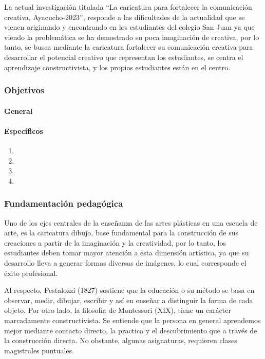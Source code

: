 \documentclass[12pt,a4paper]{article}
\begin{document}
La actual investigación titulada “La caricatura para fortalecer la comunicación creativa, Ayacucho-2023”, responde a las dificultades de la actualidad que se vienen originando y encontrando en los estudiantes del colegio San Juan ya que viendo la problemática se ha demostrado su  poca imaginación de creativa, por lo tanto, se busca mediante la caricatura fortalecer su comunicación creativa para desarrollar el potencial creativo que representan los estudiantes, se centra el aprendizaje constructivista, y los propios estudiantes están en el centro.

\subsubsection{Objetivos}

\paragraph{General}

\objetivo

\paragraph{Específicos}

\begin{enumerate}
\item \objetivoe
\item \objetivoee
\item \objetivoeee
\item \objetivoeeee
\end{enumerate}

\subsubsection{Fundamentación pedagógica}

Uno de los ejes centrales de la enseñanza de las artes plásticas en una escuela de arte, es la caricatura dibujo, base fundamental para la construcción de sus creaciones a partir de la imaginación y la creatividad, por lo tanto, los estudiantes deben tomar mayor atención a esta dimensión artística, ya que su desarrollo lleva a generar formas diversas de imágenes, lo cual corresponde el éxito profesional.

Al respecto, Pestalozzi (1827) sostiene que la educación o su método se basa en observar, medir, dibujar, escribir y así en enseñar a distinguir la forma de cada objeto.
Por otro lado, la filosofía de Montessori (XIX), tiene un carácter marcadamente constructivista. Se entiende que la persona en general aprendemos mejor mediante contacto directo, la practica y el descubrimiento que a través de la construcción directa. No obstante, algunas asignaturas, requieren clases magistrales puntuales.
\end{document}
